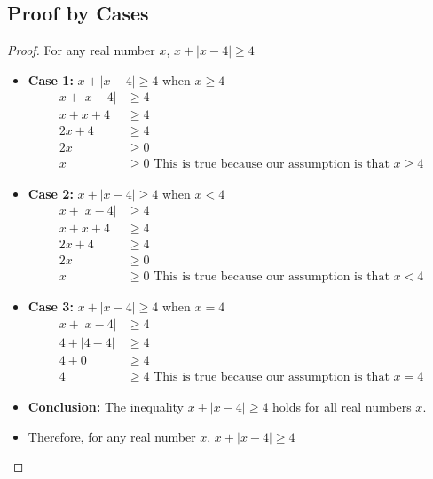 \documentclass{article}
\begin{document}
\subsection*{Proof by Cases}
\begin{proof}
    For any real number $x$, $x + |x - 4| \geq 4$
        
        \begin{itemize}
            \item[] \textbf{Case 1:} $x + |x - 4| \geq 4$ when $x \geq 4$
            \begin{align*}
            x + |x - 4| &\geq 4 \\
            x + x + 4 &\geq 4 \\
            2x + 4 &\geq 4 \\
            2x &\geq 0 \\
            x &\geq 0
            \text{ This is true because our assumption is that $x \geq 4$}
            \end{align*}
            \item[] \textbf{Case 2:} $x + |x - 4| \geq 4$ when $x < 4$
            \begin{align*}
            x + |x - 4| &\geq 4 \\
            x + x + 4 &\geq 4 \\
            2x + 4 &\geq 4 \\
            2x &\geq 0 \\
            x &\geq 0
            \text{ This is true because our assumption is that $x < 4$}
            \end{align*}
            \item[] \textbf{Case 3:} $x + |x - 4| \geq 4$ when $x = 4$
            \begin{align*}
            x + |x - 4| &\geq 4 \\
            4 + |4 - 4| &\geq 4 \\
            4 + 0 &\geq 4 \\
            4 &\geq 4
            \text{ This is true because our assumption is that $x = 4$}
            \end{align*}
            \item[] \textbf{Conclusion:} The inequality $x + |x - 4| \geq 4$ holds for all real numbers $x$.
            \item[] Therefore, for any real number $x$, $x + |x - 4| \geq 4$
            \end{itemize}
\end{proof}
\end{document}
